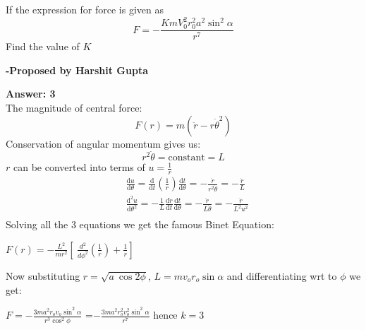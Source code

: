 \documentclass[11pt,a4paper]{scrartcl}
\begin{document}
\begin{problem}
\begin{center}
\begin{tikzpicture}[x=0.75pt,y=0.75pt,yscale=-1,xscale=1]
\end{tikzpicture}

\end{center}
If the expression for force is given as \[F = - \frac{K m V_{0}^{2} r_{0}^{2} a^2 \sin^2 \alpha}{r^7}\]
Find the value of $K$


\end{problem}
\begin{flushright}
\textbf{\Large{-Proposed by Harshit Gupta}}
\end{flushright}
\begin{solution}
{\Large{\textbf{Answer: 3}}}\\







The magnitude of central force:
$$F(r)=m({\ddot  {r}}-r{\dot  {\theta }}^{{2}})$$
Conservation of angular momentum gives us:
$$r^{{2}}{\dot  {\theta }}={\text{constant}}=L$$
$r$ can be converted into terms of $u=\frac{1}{r}$
$${\begin{aligned}&{\frac  {{\mathrm  {d}}u}{{\mathrm  {d}}\theta }}={\frac  {{\mathrm  {d}}}{{\mathrm  {d}}t}}\left({\frac  {1}{r}}\right){\frac  {{\mathrm  {d}}t}{{\mathrm  {d}}\theta }}=-{\frac  {{{\dot  {r}}}}{r^{{2}}{\dot  {\theta }}}}=-{\frac  {{{\dot  {r}}}}{L}}\\&{\frac  {{\mathrm  {d}}^{{2}}u}{{\mathrm  {d}}\theta ^{{2}}}}=-{\frac  {1}{L}}{\frac  {{\mathrm  {d}}{\dot  {r}}}{{\mathrm  {d}}t}}{\frac  {{\mathrm  {d}}t}{{\mathrm  {d}}\theta }}=-{\frac  {{{\ddot  {r}}}}{L{\dot  {\theta }}}}=-{\frac  {{{\ddot  {r}}}}{L^{{2}}u^{{2}}}}\\\end{aligned}}$$
Solving all the 3 equations we get the famous Binet Equation:

$\boxed{\displaystyle F(r) =-\frac{L^{2}}{mr^{2}}\left[ \ \frac{d^{2}}{d\phi ^{2}}\left(\frac{1}{r}\right) +\frac{1}{r}\right]}$ 

Now substituting $\displaystyle r=\sqrt{a\ \cos 2 \phi}$, $\displaystyle L=mv_{o} r_{o}\sin \alpha $ and differentiating wrt to $\phi$ we get:

$\displaystyle F=-\frac{3ma^2r_{o} v_{o}\sin^2 \alpha}{r^{3}\cos^{2}\phi}$ =$\displaystyle -\frac{3ma^2r_{o}^{2} v_{o}^{2}\sin^2 \alpha}{r^{7}}$ hence $\boxed{k=3}$









\end{solution}
\vspace{10mm}%
\end{document}
